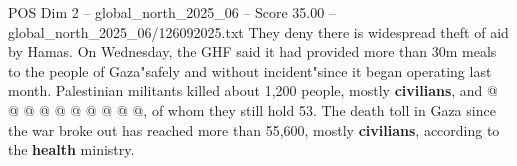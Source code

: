 \begin{textsample}{POS Dim 2 – global\_north\_2025\_06 – Score 35.00 – global\_north\_2025\_06/126092025.txt}
They deny there is widespread theft of aid by Hamas.
On Wednesday, the GHF said it had provided more than 30m meals to the people of Gaza"safely and without incident"since it began operating last month.
Palestinian militants killed about 1,200 people, mostly \textbf{civilians}, and @ @ @ @ @ @ @ @ @ @, of whom they still hold 53.
The death toll in Gaza since the war broke out has reached more than 55,600, mostly \textbf{civilians}, according to the \textbf{health} ministry.

\end{textsample}
